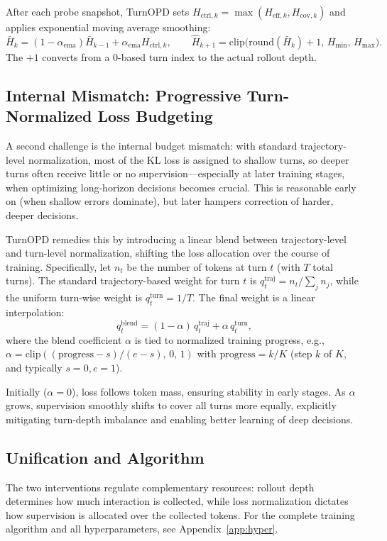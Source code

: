 After each probe snapshot, TurnOPD sets $H_{\mathrm{ctrl},k} = \max(H_{\mathrm{eff},k}, H_{\mathrm{cov},k})$ and applies exponential moving average smoothing:
\begin{equation}
\bar H_k = (1-\alpha_{\mathrm{ema}})\bar H_{k-1}
          + \alpha_{\mathrm{ema}} H_{\mathrm{ctrl},k}, \qquad
\hat H_{k+1} = \mathrm{clip}\big(\mathrm{round}(\bar H_k)+1,\,
H_{\min},\,H_{\max}\big).
\end{equation}
The $+1$ converts from a 0-based turn index to the actual rollout depth.

\subsection{Internal Mismatch: Progressive Turn-Normalized Loss Budgeting}
\label{sec:method:B}

A second challenge is the internal budget mismatch: with standard trajectory-level normalization, most of the KL loss is assigned to shallow turns, so deeper turns often receive little or no supervision—especially at later training stages, when optimizing long-horizon decisions becomes crucial. This is reasonable early on (when shallow errors dominate), but later hampers correction of harder, deeper decisions.

TurnOPD remedies this by introducing a linear blend between trajectory-level and turn-level normalization, shifting the loss allocation over the course of training. Specifically, let $n_t$ be the number of tokens at turn $t$ (with $T$ total turns). The standard trajectory-based weight for turn $t$ is $q_t^{\mathrm{traj}}=n_t/\sum_j n_j$, while the uniform turn-wise weight is $q_t^{\mathrm{turn}}=1/T$. The final weight is a linear interpolation:
\[
q_t^{\mathrm{blend}} = (1-\alpha)\,q_t^{\mathrm{traj}} + \alpha\,q_t^{\mathrm{turn}},
\]
where the blend coefficient $\alpha$ is tied to normalized training progress, e.g., $\alpha=\mathrm{clip}((\text{progress}-s)/(e-s),\,0,\,1)$ with $\text{progress} = k/K$ (step $k$ of $K$, and typically $s=0, e=1$).

Initially ($\alpha=0$), loss follows token mass, ensuring stability in early stages. As $\alpha$ grows, supervision smoothly shifts to cover all turns more equally, explicitly mitigating turn-depth imbalance and enabling better learning of deep decisions.

\subsection{Unification and Algorithm}
\label{sec:method:alg}

The two interventions regulate complementary resources: rollout depth determines how much interaction is collected, while loss normalization dictates how supervision is allocated over the collected tokens. For the complete training algorithm and all hyperparameters, see Appendix~\ref{app:hyper}.
